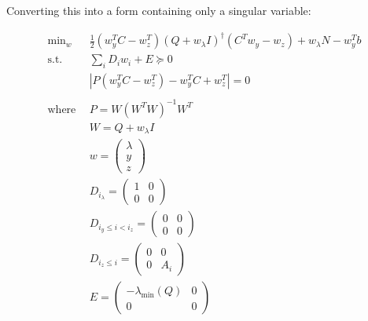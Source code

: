 \documentclass{article}
\begin{document}
Converting this into a form containing only a singular variable:

\begin{align}
	\text{min}_{w} ~ &\frac{1}{2} (w_y^T C - w_z^T) (Q+w_\lambda I)^\dagger (C^Tw_y - w_z) + w_\lambda N - w_y^T b \\ 
	\text{s.t.} ~~ &\sum_i D_i w_i + E \succeq 0 \\
			    &|P(w_y^TC-w_z^T)-w_y^T C+w_z^T| = 0 \\ 
				\\
				\text{where} ~~ &P = W (W^T W)^{-1} W^T \\
								&W = Q+w_\lambda I \\
								&w = \begin{pmatrix}\lambda \\ y \\ z \end{pmatrix} \\
								&D_{i_\lambda} = \begin{pmatrix}1 & 0 \\ 0 & 0 \end{pmatrix} \\
								&D_{i_y\le i<i_z} = \begin{pmatrix}0 & 0 \\ 0 & 0 \end{pmatrix} \\
								&D_{i_z \le i} = \begin{pmatrix}0 & 0 \\ 0 & A_i \end{pmatrix} \\
								&E = \begin{pmatrix}-\lambda_\text{min}(Q) & 0 \\ 0 & 0 \end{pmatrix} 
\end{align}
\end{document}
